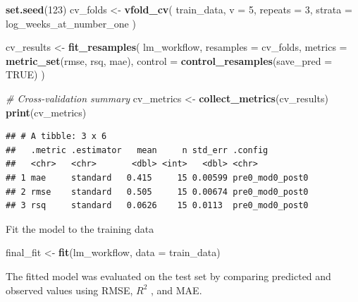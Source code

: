 \documentclass[
]{article}
\newenvironment{Shaded}{\begin{snugshade}}{\end{snugshade}}
\newcommand{\AttributeTok}[1]{\textcolor[rgb]{0.13,0.29,0.53}{#1}}
\newcommand{\CommentTok}[1]{\textcolor[rgb]{0.56,0.35,0.01}{\textit{#1}}}
\newcommand{\ConstantTok}[1]{\textcolor[rgb]{0.56,0.35,0.01}{#1}}
\newcommand{\DecValTok}[1]{\textcolor[rgb]{0.00,0.00,0.81}{#1}}
\newcommand{\FunctionTok}[1]{\textcolor[rgb]{0.13,0.29,0.53}{\textbf{#1}}}
\newcommand{\NormalTok}[1]{#1}
\newcommand{\OtherTok}[1]{\textcolor[rgb]{0.56,0.35,0.01}{#1}}
\begin{document}
\begin{Shaded}
\begin{Highlighting}[]
\FunctionTok{set.seed}\NormalTok{(}\DecValTok{123}\NormalTok{)}
\NormalTok{cv\_folds }\OtherTok{\textless{}{-}} \FunctionTok{vfold\_cv}\NormalTok{(}
\NormalTok{  train\_data,}
  \AttributeTok{v       =} \DecValTok{5}\NormalTok{,}
  \AttributeTok{repeats =} \DecValTok{3}\NormalTok{,}
  \AttributeTok{strata  =}\NormalTok{ log\_weeks\_at\_number\_one}
\NormalTok{)}

\NormalTok{cv\_results }\OtherTok{\textless{}{-}} \FunctionTok{fit\_resamples}\NormalTok{(}
\NormalTok{  lm\_workflow,}
  \AttributeTok{resamples =}\NormalTok{ cv\_folds,}
  \AttributeTok{metrics   =} \FunctionTok{metric\_set}\NormalTok{(rmse, rsq, mae),}
  \AttributeTok{control   =} \FunctionTok{control\_resamples}\NormalTok{(}\AttributeTok{save\_pred =} \ConstantTok{TRUE}\NormalTok{)}
\NormalTok{)}

\CommentTok{\# Cross{-}validation summary}
\NormalTok{cv\_metrics }\OtherTok{\textless{}{-}} \FunctionTok{collect\_metrics}\NormalTok{(cv\_results)}
\FunctionTok{print}\NormalTok{(cv\_metrics)}
\end{Highlighting}
\end{Shaded}

\begin{verbatim}
## # A tibble: 3 x 6
##   .metric .estimator   mean     n std_err .config        
##   <chr>   <chr>       <dbl> <int>   <dbl> <chr>          
## 1 mae     standard   0.415     15 0.00599 pre0_mod0_post0
## 2 rmse    standard   0.505     15 0.00674 pre0_mod0_post0
## 3 rsq     standard   0.0626    15 0.0113  pre0_mod0_post0
\end{verbatim}

Fit the model to the training data

\begin{Shaded}
\begin{Highlighting}[]
\NormalTok{final\_fit }\OtherTok{\textless{}{-}} \FunctionTok{fit}\NormalTok{(lm\_workflow, }\AttributeTok{data =}\NormalTok{ train\_data)}
\end{Highlighting}
\end{Shaded}

The fitted model was evaluated on the test set by comparing predicted
and observed values using RMSE, \(R^2\) , and MAE.
\end{document}
